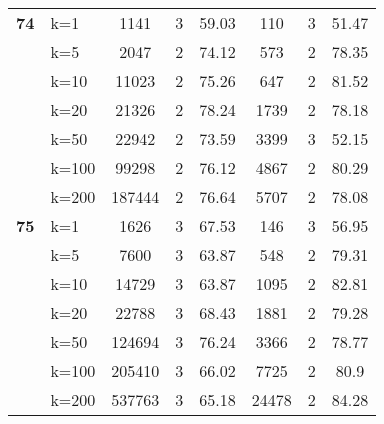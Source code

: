 \begin{table}[htbp]
\begin{tabular}{|l|l|c|c|c|c|c|c|}
    \multicolumn{1}{|r|}{\textbf{74}} & k=1 & 1141 & 3 & 59.03 & 110 & 3 & 51.47 \\ 
     & k=5 & 2047 & 2 & 74.12 & 573 & 2 & 78.35 \\ 
     & k=10 & 11023 & 2 & 75.26 & 647 & 2 & 81.52 \\ 
     & k=20 & 21326 & 2 & 78.24 & 1739 & 2 & 78.18 \\ 
     & k=50 & 22942 & 2 & 73.59 & 3399 & 3 & 52.15 \\ 
     & k=100 & 99298 & 2 & 76.12 & 4867 & 2 & 80.29 \\ 
     & k=200 & 187444 & 2 & 76.64 & 5707 & 2 & 78.08 \\ \hline
    \multicolumn{1}{|r|}{\textbf{75}} & k=1 & 1626 & 3 & 67.53 & 146 & 3 & 56.95 \\ 
     & k=5 & 7600 & 3 & 63.87 & 548 & 2 & 79.31 \\ 
     & k=10 & 14729 & 3 & 63.87 & 1095 & 2 & 82.81 \\ 
     & k=20 & 22788 & 3 & 68.43 & 1881 & 2 & 79.28 \\ 
     & k=50 & 124694 & 3 & 76.24 & 3366 & 2 & 78.77 \\ 
     & k=100 & 205410 & 3 & 66.02 & 7725 & 2 & 80.9 \\ 
     & k=200 & 537763 & 3 & 65.18 & 24478 & 2 & 84.28 \\ \hline
    \end{tabular}
\end{table}
